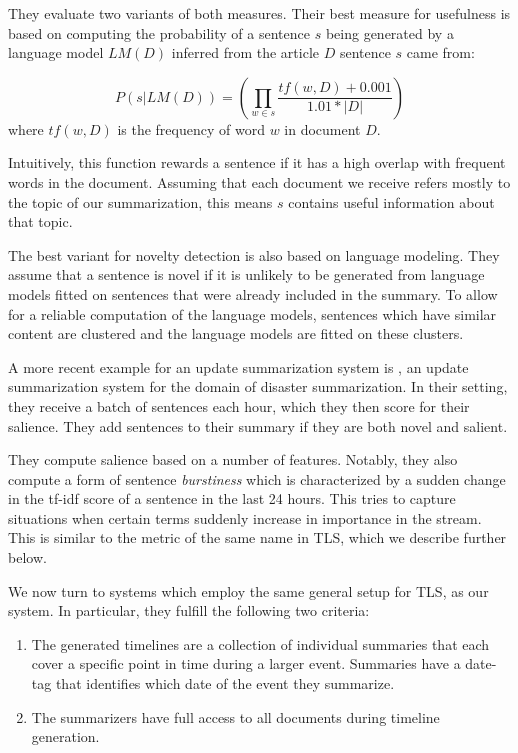 \documentclass[a4paper,BCOR=10mm]{report}
\numberwithin{lemma}{chapter}
\numberwithin{definition}{chapter}
\begin{document}
They evaluate two variants of both measures.
Their best measure for usefulness is based on computing the probability of a sentence $s$ being generated by a language model $LM(D)$ inferred from the article $D$ sentence $s$ came from:

\begin{equation}
P(s|LM(D)) = (\prod_{w \in s} \frac{\mathit{tf}(w, D) + 0.001}{1.01 * |D|})
\end{equation}
where $\mathit{tf(w, D)}$ is the frequency of word $w$ in document $D$.

Intuitively, this function rewards a sentence if it has a high overlap with frequent words in the document. Assuming that each document we receive refers mostly to the topic of our summarization, this means $s$ contains useful information about that topic.

The best variant for novelty detection is also based on language modeling.
They assume that a sentence is novel if it is unlikely to be generated from language models fitted on sentences that were already included in the summary. To allow for a reliable computation of the language models, sentences which have similar content are clustered and the language models are fitted on these clusters.

A more recent example for an update summarization system is \citet{salient-updates}, an update summarization system for the domain of disaster summarization.
In their setting, they receive a batch of sentences each hour, which they then score for their salience. They add sentences to their summary if they are both novel and salient.

They compute salience based on a number of features. Notably, they also compute a form of sentence \textit{burstiness} which is characterized by a sudden change in the tf-idf score of a sentence in the last 24 hours. This tries to capture situations when certain terms suddenly increase in importance in the stream. This is similar to the metric of the same name in TLS, which we describe further below.

We now turn to systems which employ the same general setup for TLS, as our system. In particular, they fulfill the following two criteria:

\begin{enumerate}
    \item{The generated timelines are a collection of individual summaries that each cover a specific point in time during a larger event. Summaries have a date-tag that identifies which date of the event they summarize.}
    \item{The summarizers have full access to all documents during timeline generation.}
\end{enumerate}
\end{document}
